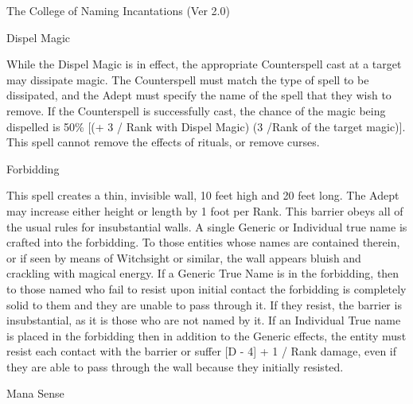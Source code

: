\begin{Chapter}{The College of Naming Incantations (Ver 2.0)}
\begin{spell}[S-5]{Dispel Magic}

\begin{effects}
While the Dispel Magic is in effect, the appropriate Counterspell cast
at a target may dissipate magic. The Counterspell must match the type
of spell to be dissipated, and the Adept must specify the name of the
spell that they wish to remove.  If the Counterspell is successfully
cast, the chance of the magic being dispelled is 50\% [(+ 3 / Rank
  with Dispel Magic) (3 /Rank of the target magic)].  This spell
cannot remove the effects of rituals, or remove curses.

\end{effects}
\end{spell}

\begin{spell}[S-6]{Forbidding}

\begin{effects}
This spell creates a thin, invisible wall, 10 feet high and 20 feet
long. The Adept may increase either height or length by 1 foot per
Rank.  This barrier obeys all of the usual rules for insubstantial
walls.  A single Generic or Individual true name is crafted into the
forbidding. To those entities whose names are contained therein, or if
seen by means of Witchsight or similar, the wall appears bluish and
crackling with magical energy.  If a Generic True Name is in the
forbidding, then to those named who fail to resist upon initial
contact the forbidding is completely solid to them and they are unable
to pass through it.  If they resist, the barrier is insubstantial, as
it is those who are not named by it. If an Individual True name is
placed in the forbidding then in addition to the Generic effects, the
entity must resist each contact with the barrier or suffer [D - 4] + 1
/ Rank damage, even if they are able to pass through the wall because
they initially resisted.
\end{effects}
\end{spell}

\begin{spell}[S-7]{Mana Sense}


\end{spell}
\end{Chapter}
